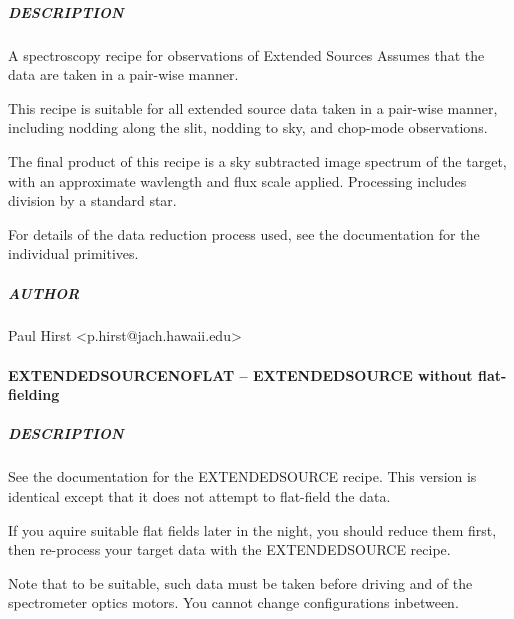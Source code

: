 \documentclass[twoside,11pt]{article}
\renewcommand{\_}{\texttt{\symbol{95}}}
\begin{document}
\subparagraph*{DESCRIPTION\label{EXTENDED_SOURCE_--_For_reducing_extended_source_observations_DESCRIPTION}}

A spectroscopy recipe for observations of Extended Sources
Assumes that the data are taken in a pair-wise manner.



This recipe is suitable for all extended source data taken in a pair-wise
manner, including nodding along the slit, nodding to sky, and
chop-mode observations.



The final product of this recipe is a sky subtracted image spectrum of
the target, with an approximate wavlength and flux scale
applied. Processing includes division by a standard star.



For details of the data reduction process used, see the documentation
for the individual primitives.

\subparagraph*{AUTHOR\label{EXTENDED_SOURCE_--_For_reducing_extended_source_observations_AUTHOR}}

Paul Hirst <p.hirst@jach.hawaii.edu>

\paragraph*{EXTENDED\_SOURCE\_NOFLAT -- EXTENDED\_SOURCE without flat-fielding\label{EXTENDED_SOURCE_NOFLAT_--_EXTENDED_SOURCE_without_flat-fielding}}



\subparagraph*{DESCRIPTION\label{EXTENDED_SOURCE_NOFLAT_--_EXTENDED_SOURCE_without_flat-fielding_DESCRIPTION}}

See the documentation for the EXTENDED\_SOURCE recipe. This version is
identical except that it does not attempt to flat-field the data.



If you aquire suitable flat fields later in the night, you should
reduce them first, then re-process your target data with the
EXTENDED\_SOURCE recipe.



Note that to be suitable, such data must be taken before driving and
of the spectrometer optics motors. You cannot change configurations
inbetween.
\end{document}
